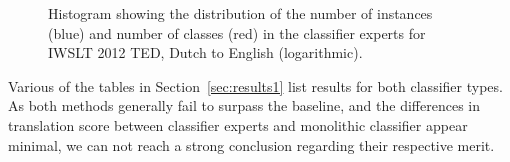 \begin{table}
\noindent{}
\caption{Number of classifier experts generated per data set.
}
\label{tab:expertcount}
\end{table}


\begin{figure}
\begin{center}
\newlength\figureheight
\newlength\figurewidth
\setlength\figureheight{6cm}
\setlength\figurewidth{8cm}

\caption{Histogram showing the distribution of the number of instances (blue)
and number of classes (red) in the classifier experts for IWSLT 2012 TED,
Dutch to English (logarithmic).}
\label{fig:histogram}
\end{center}
\end{figure}

Various of the tables in Section~\ref{sec:results1} list results for both classifier
types. As both methods generally fail to surpass the baseline, and the
differences in translation score between classifier experts and monolithic
classifier appear minimal, we can not reach a strong conclusion regarding their
respective merit.



